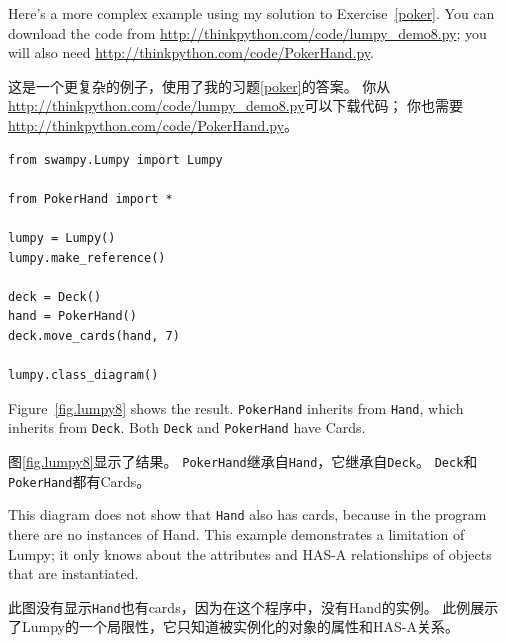 \documentclass[10pt]{book}
\begin{document}
\begin{CJK}{UTF8}{gbsn}
Here's a more complex example using my solution to Exercise~\ref{poker}.
You can download
the code from \url{http://thinkpython.com/code/lumpy_demo8.py};
you will also need \url{http://thinkpython.com/code/PokerHand.py}.

这是一个更复杂的例子，使用了我的习题\ref{poker}的答案。
你从\url{http://thinkpython.com/code/lumpy_demo8.py}可以下载代码；
你也需要\url{http://thinkpython.com/code/PokerHand.py}。

\begin{verbatim}
from swampy.Lumpy import Lumpy

from PokerHand import *

lumpy = Lumpy()
lumpy.make_reference()

deck = Deck()
hand = PokerHand()
deck.move_cards(hand, 7)

lumpy.class_diagram()
\end{verbatim}

Figure~\ref{fig.lumpy8} shows the result.  
{\tt PokerHand} inherits from {\tt Hand}, which inherits from {\tt Deck}.
Both {\tt Deck} and {\tt PokerHand} have Cards.

图\ref{fig.lumpy8}显示了结果。
{\tt PokerHand}继承自{\tt Hand}，它继承自{\tt Deck}。
{\tt Deck}和{\tt PokerHand}都有Cards。

This diagram does not show that {\tt Hand} also has cards, because
in the program there are no instances of Hand.  This example
demonstrates a limitation of Lumpy; it only knows about the
attributes and HAS-A relationships of objects that are instantiated.

此图没有显示{\tt Hand}也有cards，因为在这个程序中，没有Hand的实例。
此例展示了Lumpy的一个局限性，它只知道被实例化的对象的属性和HAS-A关系。

\printindex

\clearemptydoublepage

\ifxetex
\else
\end{CJK}
\fi
\end{document}
